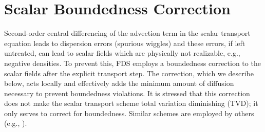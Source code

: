 %



\chapter{Scalar Boundedness Correction}
\label{app_boundedness}

Second-order central differencing of the advection term in the scalar transport equation leads to dispersion errors (spurious wiggles) and these errors, if left untreated, can lead to scalar fields which are physically not realizable, e.g., negative densities.  To prevent this, FDS employs a boundedness correction to the scalar fields after the explicit transport step.  The correction, which we describe below, acts locally and effectively adds the minimum amount of diffusion necessary to prevent boundedness violations.  It is stressed that this correction does not make the scalar transport scheme total variation diminishing (TVD); it only serves to correct for boundedness. Similar schemes are employed by others (e.g., \cite{Herrmann:2005}).

